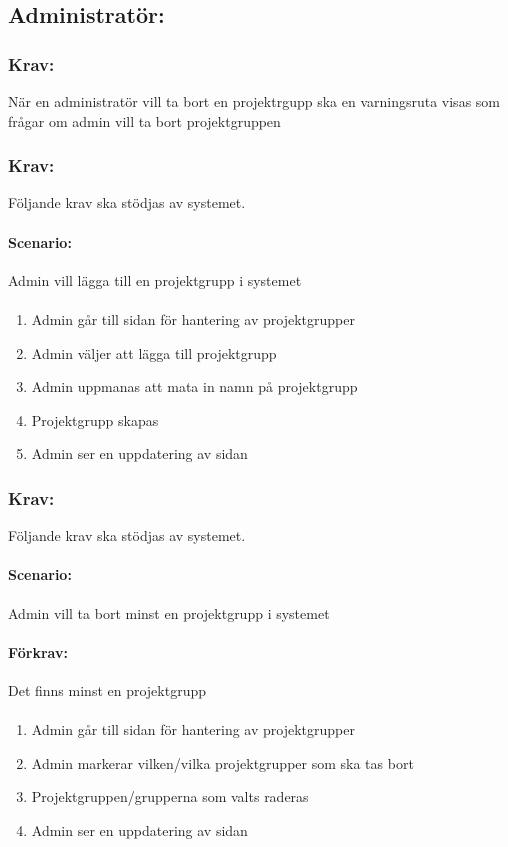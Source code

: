 \documentclass[paper=a4, fontsize=11pt,twoside]{article}
\begin{document}
\subsection{Administratör:}
\subsubsection{Krav:}
När en administratör vill ta bort en projektrgupp ska en varningsruta visas som frågar om admin vill ta bort projektgruppen

\subsubsection{Krav:} Följande krav ska stödjas av systemet.
\paragraph{Scenario:}
Admin vill lägga till en projektgrupp i systemet
\paragraph{}
\begin{enumerate}
\item Admin går till sidan för hantering av projektgrupper
\item Admin väljer att lägga till projektgrupp
\item Admin uppmanas att mata in namn på projektgrupp
\item Projektgrupp skapas
\item Admin ser en uppdatering av sidan
\end{enumerate}

\subsubsection{Krav:} 
Följande krav ska stödjas av systemet.
\paragraph{Scenario:}
Admin vill ta bort minst en projektgrupp i systemet
\paragraph{Förkrav:}
Det finns minst en projektgrupp
\paragraph{}
\begin{enumerate}
\item Admin går till sidan för hantering av projektgrupper
\item Admin markerar vilken/vilka projektgrupper som ska tas bort
\item Projektgruppen/grupperna som valts raderas
\item Admin ser en uppdatering av sidan
\end{enumerate}
\end{document}

